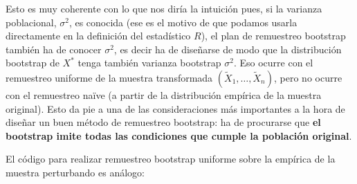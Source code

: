 \documentclass[]{book}
\theoremstyle{break}
\theoremstyle{definition}
\theoremstyle{definition}
\theoremstyle{definition}
\theoremstyle{remark}
\begin{document}
Esto es muy coherente con lo que nos diría la intuición pues, si la
varianza poblacional, \(\sigma^2\), es conocida (ese es el motivo de que
podamos usarla directamente en la definición del estadístico \(R\)), el
plan de remuestreo bootstrap también ha de conocer \(\sigma^2\), es
decir ha de diseñarse de modo que la distribución bootstrap de
\(X^{\ast}\) tenga también varianza bootstrap \(\sigma^2\). Eso ocurre
con el remuestreo uniforme de la muestra transformada
\(\left( \tilde{X}_1,\ldots ,\tilde{X}_n \right)\), pero no ocurre con
el remuestreo naïve (a partir de la distribución empírica de la muestra
original). Esto da pie a una de las consideraciones más importantes a la
hora de diseñar un buen método de remuestreo bootstrap: ha de procurarse
que \textbf{el bootstrap imite todas las condiciones que cumple la
población original}.

El código para realizar remuestreo bootstrap uniforme sobre la empírica
de la muestra perturbando es análogo:
\end{document}
